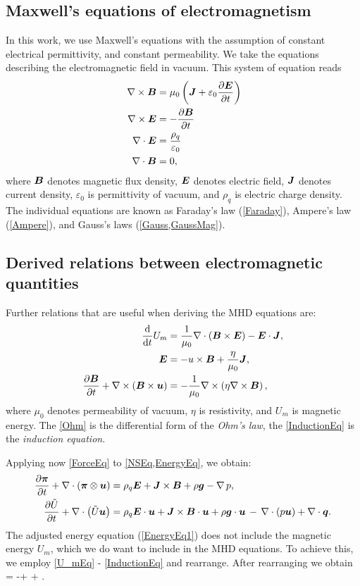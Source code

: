 \subsection{Maxwell's equations of electromagnetism}
\label{subsec:maxwell}
In this work, we use Maxwell's equations with the assumption of constant electrical permittivity, and constant permeability. We take the equations describing the electromagnetic field in vacuum. This system of equation reads
\begin{align}
\label{Ampere} \nabla \times \mbox{\boldmath $B$} & =  \mu_0 \left( \mbox{\boldmath $J$} + \varepsilon_0 \frac{\partial{\mbox{\boldmath $E$}}}{\partial{t}}\right)\\\
\label{Faraday} \nabla \times \mbox{\boldmath $E$} & =  -\frac{\partial{\mbox{\boldmath $B$}}}{\partial{t}}\\
\label{Gauss} \nabla \cdot \mbox{\boldmath $E$} & =  \frac{\rho_q}{\varepsilon_0}\\
\label{GaussMag} \nabla \cdot \mbox{\boldmath $B$} & = 0,
\end{align}
where $\mbox{\boldmath $B$}$ denotes magnetic flux density, $\mbox{\boldmath $E$}$ denotes electric field, $\mbox{\boldmath $J$}$ denotes current density, $\varepsilon_0$ is permittivity of vacuum, and $\rho_q$ is electric charge density.
The individual equations are known as Faraday's law (\cref{Faraday}), Ampere's law (\cref{Ampere}), and Gauss's laws (\cref{Gauss,GaussMag}).


\subsection{Derived relations between electromagnetic quantities}
Further relations that are useful when deriving the MHD equations are:
\begin{align}
\label{U_mEq} \frac{\text{d}}{\text{d}t} U_m & =  \frac{1}{\mu_0}\nabla \cdot \left( \mbox{\boldmath $B$}\times\mbox{\boldmath $E$}\right) - \mbox{\boldmath $E$}\cdot\mbox{\boldmath $J$},\\
\label{Ohm} \mbox{\boldmath $E$} & =  -u \times \mbox{\boldmath $B$} + \frac{\eta}{\mu_0}\mbox{\boldmath $J$},\\
\label{InductionEq} \frac{\partial{\mbox{\boldmath $B$}}}{\partial{t}} + \nabla \times \left( \mbox{\boldmath $B$} \times \mbox{\boldmath $u$} \right) & =  -\frac{1}{\mu_0} \nabla \times \left( \eta \nabla \times \mbox{\boldmath $B$} \right),
\end{align}
where $\mu_0$ denotes permeability of vacuum, $\eta$ is resistivity, and $U_m$ is magnetic energy.
The \cref{Ohm} is the differential form of the \textit{Ohm's law}, the \cref{InductionEq} is the \textit{induction equation}.

Applying now \cref{ForceEq} to \cref{NSEq,EnergyEq}, we obtain:
\begin{align}
\label{NSEq1} \frac{\partial{\mbox{\boldmath $\pi$}}}{\partial{t}} + \nabla\cdot\left(\mbox{\boldmath $\pi$}\otimes\mbox{\boldmath $u$}\right)& =  \rho_q\mbox{\boldmath $E$} + \mbox{\boldmath $J$}\times\mbox{\boldmath $B$} + \rho\mbox{\boldmath $g$} - \nabla\,p,\\
\label{EnergyEq1} \frac{\partial{\tilde{U}}}{\partial{t}} + \nabla\cdot\left({\tilde{U}}\mbox{\boldmath $u$}\right) & =  \rho_q\mbox{\boldmath $E$}\cdot\mbox{\boldmath $u$} + \mbox{\boldmath $J$}\times\mbox{\boldmath $B$}\cdot\mbox{\boldmath $u$} + \rho\mbox{\boldmath $g$}\cdot\mbox{\boldmath $u$} \,-\,\nabla\cdot\left({p}\mbox{\boldmath $u$}\right) + \nabla\cdot\mbox{\boldmath $q$}.
\end{align}
The adjusted energy equation (\cref{EnergyEq1}) does not include the magnetic energy $U_m$, which we do want to include in the MHD equations. To achieve this, we employ \cref{U_mEq} - \cref{InductionEq} and rearrange. After rearranging we obtain
\be
\label{EnergyEqPrefinal}  = -\nabla\cdot{} + \rho \bfg \cdot \bfu + \nabla\cdot\bfq.
\ee

